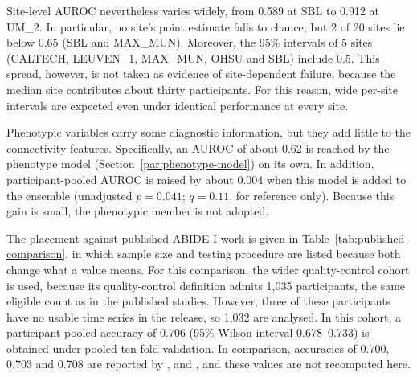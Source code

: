 Site-level AUROC nevertheless varies widely, from 0.589 at SBL to 0.912 at UM\_2. In
particular, no site's point estimate falls to chance, but 2 of 20 sites lie below 0.65
(SBL and MAX\_MUN). Moreover, the 95\% intervals of 5 sites (CALTECH, LEUVEN\_1, MAX\_MUN,
OHSU and SBL) include 0.5. This spread, however, is not taken as evidence of site-dependent
failure, because the median site contributes about thirty participants. For this reason,
wide per-site intervals are expected even under identical performance at every site.

Phenotypic variables carry some diagnostic information, but they add little to the
connectivity features. Specifically, an AUROC of about 0.62 is reached by the phenotype
model (Section~\ref{par:phenotype-model}) on its own. In addition, participant-pooled AUROC is raised
by about 0.004 when this model is added to the ensemble (unadjusted $p=0.041$; $q=0.11$,
for reference only). Because this gain is small, the phenotypic member is not adopted.

The placement against published ABIDE-I work is given in Table~\ref{tab:published-comparison}, in
which sample size and testing procedure are listed because both change what a value means.
For this comparison, the wider quality-control cohort is used,
because its quality-control definition admits 1,035 participants, the same eligible count
as in the published studies. However, three of these participants have no usable time
series in the release, so 1,032 are analysed. In this cohort, a participant-pooled accuracy
of 0.706 (95\% Wilson interval 0.678--0.733) is obtained under pooled ten-fold validation. In comparison, accuracies of 0.700, 0.703 and 0.708 are
reported by \citet{Heinsfeldetal2018}, \citet{Eslamietal2019} and
\citet{AlmuqhimSaeed2021}, and these values are not recomputed here.

